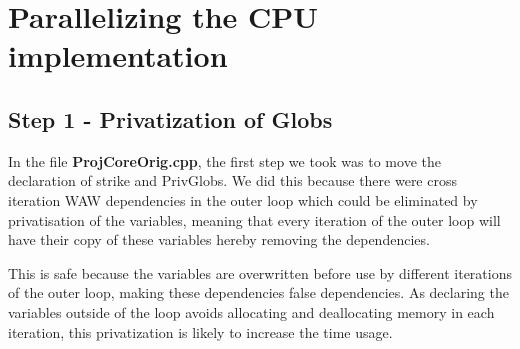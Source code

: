 \documentclass{article}
\begin{document}

\section*{Parallelizing the CPU implementation}

\subsection*{Step 1 - Privatization of Globs}
In the file \textbf{ProjCoreOrig.cpp}, the first step we took was to move the declaration of strike and PrivGlobs. We did this because there were cross iteration WAW dependencies in the outer loop which could be eliminated by privatisation of the variables, meaning that every iteration of the outer loop will have their copy of these variables hereby removing the dependencies. 

This is safe because the variables are overwritten before use by different iterations of the outer loop, making these dependencies false dependencies. As declaring the variables outside of the loop avoids allocating and deallocating memory in each iteration, this privatization is likely to increase the time usage.
\end{document}
